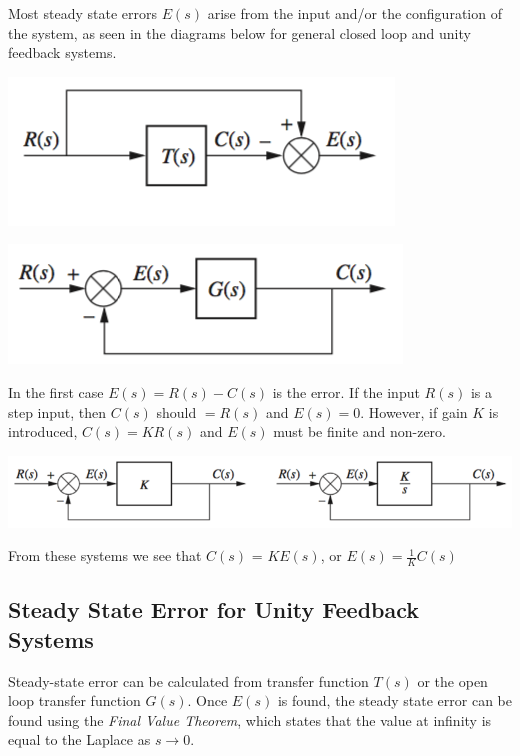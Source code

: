\documentclass[11pt]{article}
\begin{document}
    Most steady state errors $E(s)$ arise from the input and/or the configuration of the system, as seen in the diagrams below for general closed loop and unity feedback systems.

    \begin{center}
        \includegraphics[width=300 px]{img/closedlooperror} \\
    \end{center}

    \begin{center}
        \includegraphics[width=300 px]{img/unityfeedback} \\
    \end{center}
    
    In the first case $E(s) = R(s) - C(s)$ is the error. If the input $R(s)$ is a step input, then $C(s)$ should $= R(s)$ and $E(s) = 0$. However, if gain $K$ is introduced, $C(s) = KR(s)$ and $E(s)$ must be finite and non-zero. \\
    
    \begin{center}
        \includegraphics[width=300 px]{img/integrator} \\
    \end{center}

    From these systems we see that $C(s)$ = $KE(s)$, or $E(s) = \frac{1}{K}C(s)$

    \subsection{Steady State Error for Unity Feedback Systems}

    Steady-state error can be calculated from transfer function $T(s)$ or the open loop transfer function $G(s)$. Once $E(s)$ is found, the steady state error can be found using the \textit{Final Value Theorem}, which states that the value at infinity is equal to the Laplace as $s \rightarrow 0$.
\end{document}
